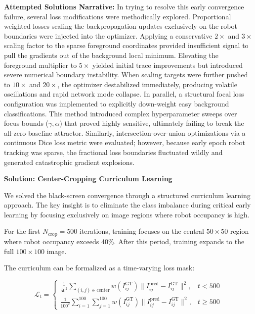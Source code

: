 \documentclass[12pt,a4paper,oneside]{report}
\begin{document}
\textbf{Attempted Solutions Narrative:}
In trying to resolve this early convergence failure, several loss modifications were methodically explored. Proportional weighted losses scaling the backpropagation updates exclusively on the robot boundaries were injected into the optimizer. Applying a conservative $2\times$ and $3\times$ scaling factor to the sparse foreground coordinates provided insufficient signal to pull the gradients out of the background local minimum. Elevating the foreground multiplier to $5\times$ yielded initial trace improvements but introduced severe numerical boundary instability. When scaling targets were further pushed to $10\times$ and $20\times$, the optimizer destabilized immediately, producing volatile oscillations and rapid network mode collapse. In parallel, a structural focal loss configuration was implemented to explicitly down-weight easy background classifications. This method introduced complex hyperparameter sweeps over focus bounds ($\gamma, \alpha$) that proved highly sensitive, ultimately failing to break the all-zero baseline attractor. Similarly, intersection-over-union optimizations via a continuous Dice loss metric were evaluated; however, because early epoch robot tracking was sparse, the fractional loss boundaries fluctuated wildly and generated catastrophic gradient explosions.

\textbf{Solution: Center-Cropping Curriculum Learning}

We solved the black-screen convergence through a structured curriculum learning approach. The key insight is to eliminate the class imbalance during critical early learning by focusing exclusively on image regions where robot occupancy is high.

For the first $N_{\text{crop}} = 500$ iterations, training focuses on the central $50 \times 50$ region where robot occupancy exceeds 40\%. After this period, training expands to the full $100 \times 100$ image.

The curriculum can be formalized as a time-varying loss mask:

\begin{equation}
\mathcal{L}_t = \begin{cases}
\frac{1}{50^2} \sum_{(i,j) \in \text{center}} w(I_{ij}^{\text{GT}}) \|I_{ij}^{\text{pred}} - I_{ij}^{\text{GT}}\|^2, & t < 500 \\
\frac{1}{100^2} \sum_{i=1}^{100}\sum_{j=1}^{100} w(I_{ij}^{\text{GT}}) \|I_{ij}^{\text{pred}} - I_{ij}^{\text{GT}}\|^2, & t \geq 500
\end{cases}
\end{equation}
\end{document}
